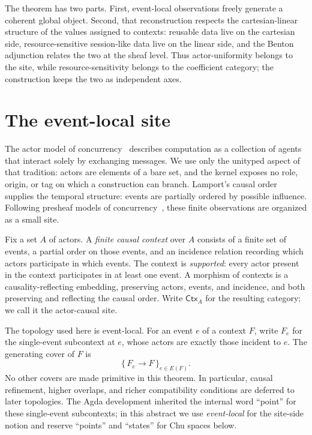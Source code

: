 \documentclass[11pt]{article}
\newcommand{\Ctx}{\mathsf{Ctx}}
\begin{document}
The theorem has two parts. First, event-local observations freely generate a
coherent global object. Second, that reconstruction respects the
cartesian-linear structure of the values assigned to contexts: reusable data
live on the cartesian side, resource-sensitive session-like data live on the
linear side, and the Benton adjunction relates the two at the sheaf level. Thus
actor-uniformity belongs to the site, while resource-sensitivity belongs to the
coefficient category; the construction keeps the two as independent axes.

\section*{The event-local site}

The actor model of concurrency~\cite{Hewitt1973} describes computation as a
collection of agents that interact solely by exchanging messages. We use only
the unityped aspect of that tradition: actors are elements of a bare set, and
the kernel exposes no role, origin, or tag on which a construction can branch.
Lamport's causal order~\cite{Lamport1978} supplies the temporal structure:
events are partially ordered by possible influence. Following
presheaf models of concurrency~\cite{CattaniWinskel1996}, these finite
observations are organized as a small site.

Fix a set $A$ of actors. A \emph{finite causal context} over $A$ consists of a
finite set of events, a partial order on those events, and an incidence relation
recording which actors participate in which events. The context is
\emph{supported}: every actor present in the context participates in at least one
event. A morphism of contexts is a causality-reflecting embedding, preserving
actors, events, and incidence, and both preserving and reflecting the causal
order. Write $\Ctx_A$ for the resulting category; we call it the actor-causal
site.

The topology used here is event-local. For an event $e$ of a context $F$, write
$F_e$ for the single-event subcontext at $e$, whose actors are exactly those
incident to $e$. The generating cover of $F$ is
\[
  \{\,F_e\longrightarrow F\,\}_{e\in E(F)}.
\]
No other covers are made primitive in this theorem. In particular, causal
refinement, higher overlaps, and richer compatibility conditions are deferred to
later topologies. The Agda development inherited the internal word ``point'' for
these single-event subcontexts; in this abstract we use \emph{event-local} for
the site-side notion and reserve ``points'' and ``states'' for Chu spaces below.
\end{document}
